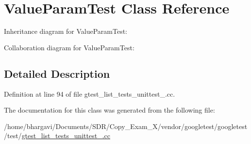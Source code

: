 \hypertarget{class_value_param_test}{}\section{Value\+Param\+Test Class Reference}
\label{class_value_param_test}


Inheritance diagram for Value\+Param\+Test\+:


Collaboration diagram for Value\+Param\+Test\+:


\subsection{Detailed Description}


Definition at line 94 of file gtest\+\_\+list\+\_\+tests\+\_\+unittest\+\_\+.\+cc.



The documentation for this class was generated from the following file\+:\begin{DoxyCompactItemize}
\item 
/home/bhargavi/\+Documents/\+S\+D\+R/\+Copy\+\_\+\+Exam\+\_\+X/vendor/googletest/googletest/test/\hyperlink{gtest__list__tests__unittest___8cc}{gtest\+\_\+list\+\_\+tests\+\_\+unittest\+\_\+.\+cc}\end{DoxyCompactItemize}

